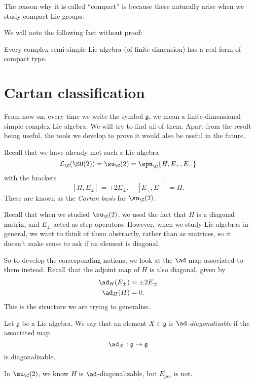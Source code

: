 \documentclass[a4paper]{article}
\begin{document}
The reason why it is called ``compact'' is because these naturally arise when we study compact Lie groups.

We will note the following fact without proof:
\begin{thm}
  Every complex semi-simple Lie algebra (of finite dimension) has a real form of compact type.
\end{thm}

\section{Cartan classification}
From now on, every time we write the symbol $\mathfrak{g}$, we mean a finite-dimensional simple complex Lie algebra. We will try to find all of them. Apart from the result being useful, the tools we develop to prove it would also be useful in the future.

Recall that we have already met such a Lie algebra
\[
  \mathcal{L}_\C(\SU(2)) = \su_\C(2) = \spn_\C \{H, E_+, E_-\}
\]
with the brackets
\[
  [H, E_{\pm}] = \pm 2E_{\pm},\quad [E_+, E_-] = H.
\]
These are known as the \emph{Cartan basis} for $\su_\C(2)$.

Recall that when we studied $\su_\C(2)$, we used the fact that $H$ is a diagonal matrix, and $E_{\pm}$ acted as step operators. However, when we study Lie algebras in general, we want to think of them abstractly, rather than as matrices, so it doesn't make sense to ask if an element is diagonal.

So to develop the corresponding notions, we look at the $\ad$ map associated to them instead. Recall that the adjoint map of $H$ is also diagonal, given by
\begin{align*}
  \ad_H(E_{\pm}) &= \pm 2 E_{\pm}\\
  \ad_H(H) &= 0.
\end{align*}
This is the structure we are trying to generalize.

\begin{defi}[$\ad$-diagonalizable]
  Let $\mathfrak{g}$ be a Lie algebra. We say that an element $X \in \mathfrak{g}$ is \emph{$\ad$-diagonalizable} if the associated map
  \[
    \ad_X: \mathfrak{g} \to \mathfrak{g}
  \]
  is diagonalizable.
\end{defi}

\begin{eg}
  In $\su_\C(2)$, we know $H$ is $\ad$-diagonalizable, but $E_{pm}$ is not.
\end{eg}
\end{document}
